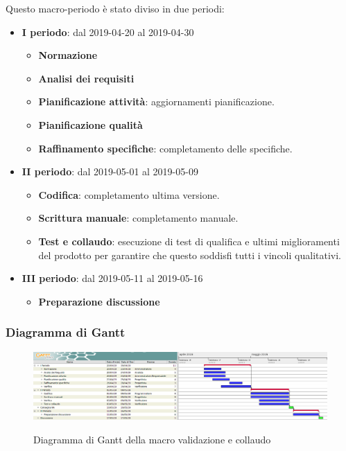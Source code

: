         Questo macro-periodo è stato diviso in due periodi:
		\begin{itemize}
			\item \textbf{I periodo}: dal 2019-04-20 al 2019-04-30
			\begin{itemize}
    	        \item \textbf{Normazione}
    	        \item \textbf{Analisi dei requisiti}
    	        \item \textbf{Pianificazione attività}: aggiornamenti pianificazione.
    	        \item \textbf{Pianificazione qualità}
    	        \item \textbf{Raffinamento specifiche}: completamento delle specifiche.
        	\end{itemize}
			\item \textbf{II periodo}: dal 2019-05-01 al 2019-05-09
			\begin{itemize}
    	        \item \textbf{Codifica}: completamento ultima versione.
    	        \item \textbf{Scrittura manuale}: completamento manuale.
    	        \item \textbf{Test e collaudo}: esecuzione di test di qualifica e ultimi miglioramenti del prodotto per
    	        garantire che questo soddisfi tutti i vincoli qualitativi.
			\end{itemize}
			\item \textbf{III periodo}: dal 2019-05-11 al 2019-05-16
			\begin{itemize}
				\item \textbf{Preparazione discussione}
			\end{itemize}
		\end{itemize}

        \begin{landscape}
			\subsubsection{Diagramma di Gantt}
			\begin{figure}[H]
					\centering
					\includegraphics[scale=0.42]{img/Validazione_e_collaudo.png}\\
					\caption{Diagramma di Gantt della macro validazione e collaudo}
			\end{figure}
		\end{landscape}
		\newpage
